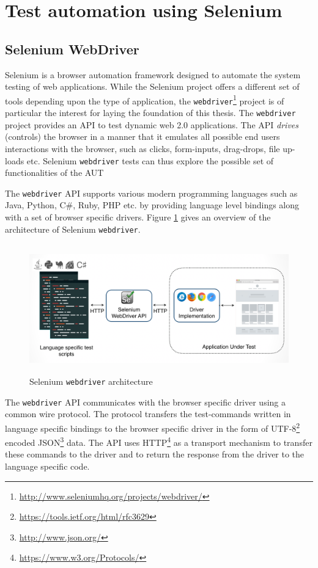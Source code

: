 \section{Test automation using Selenium}
\label{sec:SeleniumTesting}
\subsection{Selenium WebDriver}
Selenium is a browser automation framework designed to automate the system testing of web applications. While the Selenium project offers a different set of tools depending upon the type of application, the  \texttt{webdriver}\footnote{\url{http://www.seleniumhq.org/projects/webdriver/}} project is of particular the interest for laying the foundation of this thesis. The \texttt{webdriver} project provides an API to test dynamic web 2.0 applications. The API \textit{drives} (controls) the browser in a manner that it emulates all possible end users interactions with the browser, such as clicks, form-inputs, drag-drops, file up- loads etc. Selenium \texttt{webdriver} tests can thus explore the possible set of functionalities of the AUT 

The \texttt{webdriver} API supports various modern programming languages such as Java, Python, C\#, Ruby, PHP etc. by providing language level bindings along with a set of browser specific drivers. Figure \ref{fig:webdriverArchitecture} gives an overview of the architecture of Selenium \texttt{webdriver}.
 
\begin{figure}[h!]
\makeatletter 
\makeatother
    \centering
  \includegraphics[width=5.5in,height=2.2in]{./Figures/webdriver_Archi}
  \caption{Selenium \texttt{webdriver} architecture}
  \label{fig:webdriverArchitecture} 
\end{figure}

The \texttt{webdriver} API communicates with the browser specific driver using a common wire protocol. The protocol transfers the test-commands written in language specific bindings to the browser specific driver in the form of UTF-8\footnote{\url{https://tools.ietf.org/html/rfc3629}} encoded JSON\footnote{\url{http://www.json.org/}} data. The API uses HTTP\footnote{\url{https://www.w3.org/Protocols/}} as a transport mechanism to transfer these commands to the driver and to return the response from the driver to the language specific code. 

